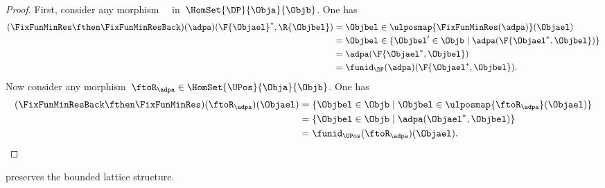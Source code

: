 \begin{proof}
    First, consider any morphism~~ in~$\HomSet{\DP}{\Obja}{\Objb}$.
    One has
    \begin{equation*}
        \begin{aligned}
            (\FixFunMinRes \fthen \FixFunMinResBack)(\adpa)(\F{\Objael}^*,\R{\Objbel})
             & =
            \Objbel \in \ulposmap{\FixFunMinRes(\adpa)}(\Objael)                      \\
             & =\Objbel \in \{ \Objbel' \in \Objb \mid \adpa(\F{\Objael^*,\Objbel})\} \\
             & =\adpa(\F{\Objael^*,\Objbel})                                          \\
             & =\funid_\DP(\adpa)(\F{\Objael^*,\Objbel}).
        \end{aligned}
    \end{equation*}
    Now consider any morphism~$\ftoR_\adpa \in \HomSet{\UPos}{\Obja}{\Objb}$.
    One has
    \begin{equation*}
        \begin{aligned}
            (\FixFunMinResBack \fthen \FixFunMinRes)(\ftoR_\adpa)(\Objael)
             & =
            \{ \Objbel \in \Objb\mid \Objbel \in \ulposmap{\ftoR_\adpa}(\Objael)\} \\
             & =\{ \Objbel \in \Objb\mid \adpa(\Objael^*,\Objbel)\}                \\
             & =\funid_\UPos(\ftoR_\adpa)(\Objael).
        \end{aligned}
    \end{equation*}

\end{proof}
\begin{lemma}
    \FixFunMinRes preserves the bounded lattice structure.
\end{lemma}
